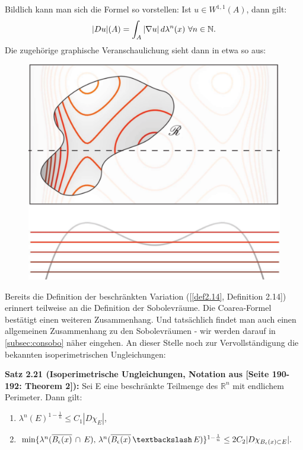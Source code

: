 Bildlich kann man sich die Formel so vorstellen: Ist \(u \in W^{1,1}(A)\), dann gilt:
\begin{equation}{\label{eq2.28a}}
    |Du|(A) = \int_A |\nabla u| \, d\lambda^n(x) \, \, \forall n \in \mathbb{N}.
\end{equation}
Die zugehörige graphische Veranschaulichung sieht dann in etwa so aus:
\newpage
\begin{figure}[label={fig:coarea}, caption={Graphische Vorstellung der Coarea-Formel für \(A = \mathscr{R}\): Übergang vom Integral über die Super-Niveaumengen zum Integral über \(A\) \cite{CoArea}}]
    \includegraphics[scale=0.3]{figures/Coarea.pdf}
\end{figure}

Bereits die Definition der beschränkten Variation ([\ref{def2.14}, Definition 2.14]) erinnert teilweise an die Definition der Sobolevräume. Die Coarea-Formel bestätigt einen weiteren Zusammenhang. Und tatsächlich findet man auch einen allgemeinen Zusammenhang zu den Sobolevräumen - wir werden darauf in \ref{subsec:consobo} näher eingehen. An dieser Stelle noch zur Vervollständigung die bekannten isoperimetrischen Ungleichungen:\\[0.5cm]
\colorbox{generalYellow}{\begin{minipage}{16cm}{\textcolor{black}{}{\label{theo2.21}}}
\textbf{Satz 2.21 (Isoperimetrische Ungleichungen, Notation aus \cite{EvansMeaTh}[Seite 190-192: Theorem 2]):} Sei E eine beschränkte Teilmenge des \(\mathbb{R}^n\) mit endlichem Perimeter. Dann gilt:
\begin{enumerate}
    \item \(\lambda^n(E)^{1-\frac{1}{n}} \leq C_1 |D \chi_E|\),
    \item \(\min \{\lambda^n(\overline{B_{\epsilon}(x)} \, \cap \, E), \, \lambda^n(\overline{B_{\epsilon}(x)} \, \textbackslash \, E)\}^{1-\frac{1}{n}} \leq 2C_2 |D \chi_{\Ball \subset E}|.\)
\end{enumerate}
\end{minipage}}\\

